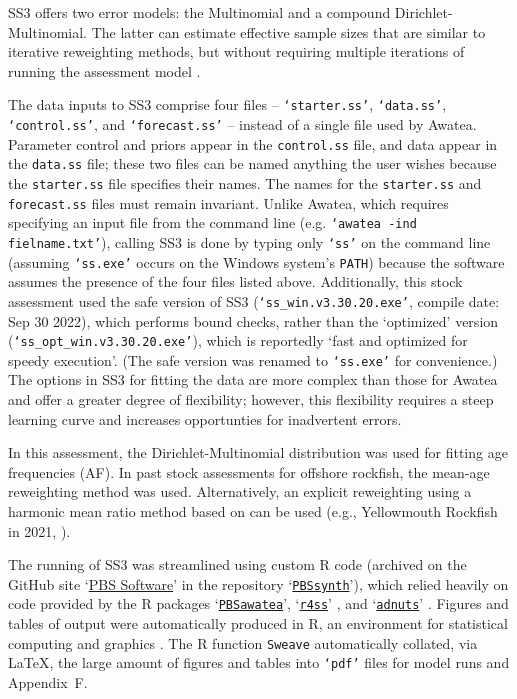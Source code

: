 \documentclass[11pt]{book}
\newcommand{\code}[1]{\normalsize\texttt{#1}\normalsize}%
\newcommand{\AppRes}{Appendix~F}
\begin{document}
SS3 offers two error models: the Multinomial and a compound Dirichlet-Multinomial.
The latter can estimate effective sample sizes that are similar to iterative reweighting methods, but without requiring multiple iterations of running the assessment model \citep{Thorson-etal:2017}.

The data inputs to SS3 comprise four files -- \code{`starter.ss'}, \code{`data.ss'}, \code{`control.ss'}, and \code{`forecast.ss'} -- instead of a single file used by Awatea.
Parameter control and priors appear in the \code{control.ss} file, and data appear in the \code{data.ss} file; these two files can be named anything the user wishes because the \code{starter.ss} file specifies their names.
The names for the \code{starter.ss} and \code{forecast.ss} files must remain invariant.
Unlike Awatea, which requires specifying an input file from the command line (e.g. \code{`awatea -ind fielname.txt'}), calling SS3 is done by typing only \code{`ss'} on the command line (assuming \code{`ss.exe'} occurs on the Windows system's \code{PATH}) because the software assumes the presence of the four files listed above.
Additionally, this stock assessment used the safe version of SS3 (\code{`ss\_win.v3.30.20.exe'}, compile date: Sep 30 2022), which performs bound checks, rather than the `optimized' version (\code{`ss\_opt\_win.v3.30.20.exe'}), which is reportedly `fast and optimized for speedy execution'.
(The safe version was renamed to \code{`ss.exe'} for convenience.)
The options in SS3 for fitting the data are more complex than those for Awatea and offer a greater degree of flexibility; however, this flexibility requires a steep learning curve and increases opportunties for inadvertent errors.

In this assessment, the Dirichlet-Multinomial distribution was used for fitting age frequencies (AF).
In past stock assessments for offshore rockfish, the \citet{Francis:2011} mean-age reweighting method was used.
Alternatively, an explicit reweighting using a harmonic mean ratio method based on \citet{McAllister-Ianelli:1997} can be used (e.g., Yellowmouth Rockfish in 2021, \citealt{Starr-Haigh:2022_ymr}).

The running of SS3 was streamlined using custom R code (archived on the GitHub site `\href{https://github.com/pbs-software}{PBS Software}' in the repository `\href{https://github.com/pbs-software/pbs-synth}{\code{PBSsynth}}'), which relied heavily on code provided by the R packages `\href{https://github.com/pbs-software/pbs-awatea}{\code{PBSawatea}}', `\href{https://github.com/r4ss/r4ss}{\code{r4ss}}' \citep{R:2021_r4ss}, and `\href{https://github.com/Cole-Monnahan-NOAA/adnuts}{\code{adnuts}}' \citep{R:2018_adnuts}.
Figures and tables of output were automatically produced in R, an environment for statistical computing and graphics \citep{R:2021_base}. 
The R function \code{Sweave} \citep{Leisch:2002} automatically collated, via \LaTeX, the large amount of figures and tables into \code{`pdf'} files for model runs and \AppRes.
\end{document}
